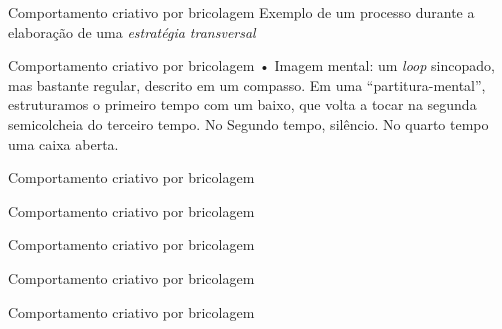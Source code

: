 \documentclass[aspectratio=169]{beamer}
\begin{document}
\begin{frame}{Comportamento criativo por bricolagem}
Exemplo de um processo durante a elaboração de uma \emph{estratégia transversal}
\end{frame}

\begin{frame}{Comportamento criativo por bricolagem}
• Imagem mental: um \emph{loop} sincopado, mas bastante regular, descrito em um compasso. Em uma ``partitura-mental'', estruturamos o primeiro tempo com um baixo, que volta a tocar na segunda semicolcheia do terceiro tempo. No Segundo tempo, silêncio. No quarto tempo uma caixa aberta.
\end{frame}

\begin{frame}{Comportamento criativo por bricolagem}

\end{frame}


\begin{frame}[allowframebreaks]{Comportamento criativo por bricolagem}
\haskellA
\end{frame}

\begin{frame}{Comportamento criativo por bricolagem}

\end{frame}


\begin{frame}{Comportamento criativo por bricolagem}
\haskellB
\end{frame}

\begin{frame}{Comportamento criativo por bricolagem}

\end{frame}
\end{document}
